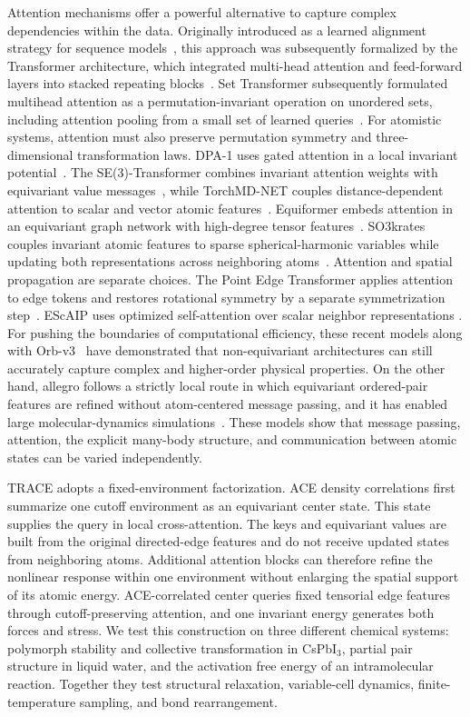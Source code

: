 \documentclass[aps,prx,preprint,notitlepage,superscriptaddress,nofootinbib,floatfix]{revtex4-2}
\newif\ifshowrevisions
\newcommand{\draftthirty}[1]{%
  \ifshowrevisions\textcolor{draftthirtycolor}{#1}\else#1\fi}
\begin{document}
Attention mechanisms offer a powerful alternative to capture complex dependencies within the data. Originally introduced as a learned alignment strategy for sequence models~\cite{bahdanau2015}, this approach was subsequently formalized by the Transformer architecture, which integrated multi-head attention and feed-forward layers into stacked repeating blocks~\cite{vaswani2017}. \draftthirty{Set Transformer subsequently formulated multihead attention as a permutation-invariant operation on unordered sets, including attention pooling from a small set of learned queries~\cite{lee2019set}.} For atomistic systems, attention must also preserve permutation symmetry and three-dimensional transformation laws. DPA-1 uses gated attention in a local invariant potential~\cite{zhang2024dpa1}. The SE(3)-Transformer combines invariant attention weights with equivariant value messages~\cite{fuchs2020se3}, while TorchMD-NET couples distance-dependent attention to scalar and vector atomic features~\cite{tholke2022torchmd}. Equiformer embeds attention in an equivariant graph network with high-degree tensor features~\cite{liao2026}. SO3krates couples invariant atomic features to sparse spherical-harmonic variables while updating both representations across neighboring atoms~\cite{frank2022so3krates}. Attention and spatial propagation are separate choices. The Point Edge Transformer applies attention to edge tokens and restores rotational symmetry by a separate symmetrization step~\cite{pozdnyakov2023}. EScAIP uses optimized self-attention over scalar neighbor representations \cite{qu2024}. For pushing the boundaries of computational efficiency, these recent models along with Orb-v3~\cite{rhodes2025} have demonstrated that non-equivariant architectures can still accurately capture complex and higher-order physical properties. On the other hand, allegro follows a strictly local route in which equivariant ordered-pair features are refined without atom-centered message passing, and it has enabled large molecular-dynamics simulations~\cite{musaelian2023}. These models show that message passing, attention, the explicit many-body structure, and communication between atomic states can be varied independently.

TRACE adopts a fixed-environment factorization. ACE density correlations first summarize one cutoff environment as an equivariant center state. This state supplies the query in local cross-attention. The keys and equivariant values are built from the original directed-edge features and do not receive updated states from neighboring atoms. Additional attention blocks can therefore refine the nonlinear response within one environment without enlarging the spatial support of its atomic energy. ACE-correlated center queries fixed tensorial edge features through cutoff-preserving attention, and one invariant energy generates both forces and stress. We test this construction on three different chemical systems: polymorph stability and collective transformation in CsPbI$_3$, partial pair structure in liquid water, and the activation free energy of an intramolecular reaction. Together they test structural relaxation, variable-cell dynamics, finite-temperature sampling, and bond rearrangement. 
\end{document}
